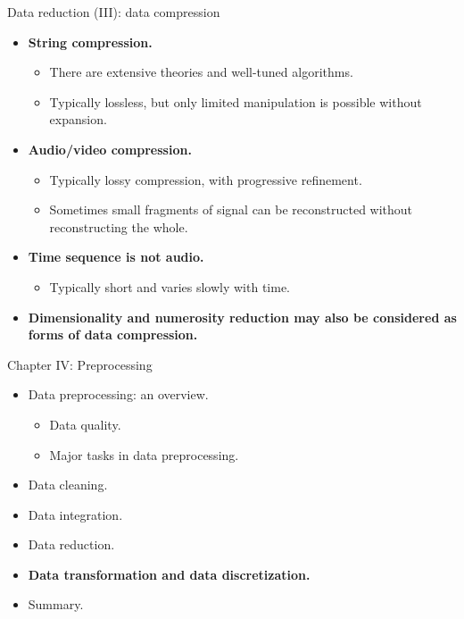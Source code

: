 \documentclass[aspectratio=169,t]{beamer}
\begin{document}
  { 
    \begin{frame}{Data reduction (III): data compression}
        \begin{itemize}
            \item \textbf{String compression.}
            \begin{itemize}
              \item There are extensive theories and well-tuned algorithms.
              \item Typically lossless, but only limited manipulation is possible without expansion.
            \end{itemize}
            \item \textbf{Audio/video compression.}
            \begin{itemize}
              \item Typically lossy compression, with progressive refinement.
              \item Sometimes small fragments of signal can be reconstructed without reconstructing the whole.
            \end{itemize}
            \item \textbf{Time sequence is not audio.}
            \begin{itemize}
              \item Typically short and varies slowly with time.
            \end{itemize}
            \item \textbf{Dimensionality and numerosity reduction may also be considered as forms of data compression.}
        \end{itemize}
    \end{frame}
  }

  { 
    \begin{frame}{Chapter IV: Preprocessing}
        \begin{itemize}
            \item Data preprocessing: an overview.
            \begin{itemize}
              \item Data quality.
              \item Major tasks in data preprocessing.
            \end{itemize}
            \item Data cleaning.
            \item Data integration.
            \item Data reduction.
            \item \textbf{Data transformation and data discretization.}
            \item Summary.
        \end{itemize}
    \end{frame}
  }
\end{document}
